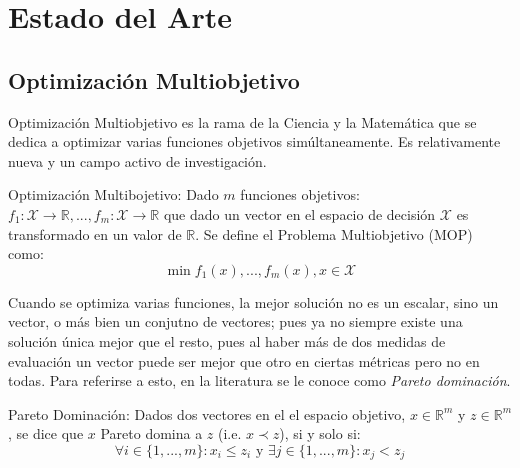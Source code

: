 \chapter{Estado del Arte}\label{chapter:state-of-the-art}

\section{Optimizaci\'on Multiobjetivo}

Optimizaci\'on Multiobjetivo es la rama de la Ciencia y la Matem\'atica que se dedica a optimizar varias funciones objetivos sim\'ultaneamente. Es relativamente nueva y un campo activo de investigaci\'on.
 
\begin{definition}{Optimizaci\'on Multibojetivo:}
     Dado $m$ funciones objetivos: $f_1: \mathcal{X} \rightarrow \mathbb{R}, ..., f_m: \mathcal{X} \rightarrow \mathbb{R}$ que dado un vector en el espacio de decisi\'on $\mathcal{X}$ es transformado en un valor de $\mathbb{R}$. Se define el Problema Multiobjetivo (MOP) como:
    \begin{equation*}
        \min f_1(x), ..., f_m(x), x \in \mathcal{X}
    \end{equation*}
\end{definition}

Cuando se optimiza varias funciones, la mejor soluci\'on  no es un escalar, sino un vector, o m\'as bien un conjutno de vectores; pues ya no siempre existe una soluci\'on \'unica mejor que el resto, pues al haber m\'as de dos medidas de evaluaci\'on un vector puede ser mejor que otro en ciertas m\'etricas pero no en todas. Para referirse a esto, en la literatura se le conoce como \textit{Pareto dominaci\'on}.

\begin{definition}{Pareto Dominaci\'on:}
    Dados dos vectores en el el espacio objetivo, $x \in \mathbb{R}^m$ y $z \in \mathbb{R}^m$, se dice que $x$ Pareto domina a $z$ (i.e. $x \prec z$), si y solo si:
    \begin{equation*}
        \forall i \in \{1, ..., m\}: x_i \leq z_i \text{ y } \exists j \in \{1, ..., m\}: x_j < z_j
    \end{equation*}
\end{definition}


